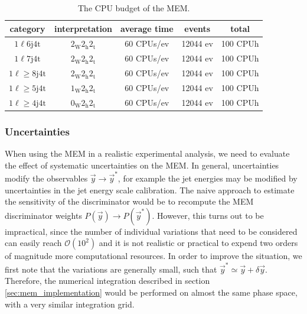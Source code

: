 \begin{table}[h!]
\begin{center}
\caption{The CPU budget of the MEM. \fix}
\label{tab:mem_cpu_budget}
\begin{tabular}{ccccc}
\hline
category & interpretation & average time & events & total \\
\hline
$1\ell6\mathrm{j}4\mathrm{t}$ & $2_{\mathrm{W}} 2_{\mathrm{h}} 2_{\mathrm{t}}$ & 60 CPUs/ev & 12044 ev & 100 CPUh \\
$1\ell7\mathrm{j}4\mathrm{t}$ & $2_{\mathrm{W}} 2_{\mathrm{h}} 2_{\mathrm{t}}$ & 60 CPUs/ev & 12044 ev & 100 CPUh \\
$1\ell\ge8\mathrm{j}4\mathrm{t}$ & $2_{\mathrm{W}} 2_{\mathrm{h}} 2_{\mathrm{t}}$ & 60 CPUs/ev & 12044 ev & 100 CPUh \\
$1\ell\ge5\mathrm{j}4\mathrm{t}$ & $1_{\mathrm{W}} 2_{\mathrm{h}} 2_{\mathrm{t}}$ & 60 CPUs/ev & 12044 ev & 100 CPUh \\
$1\ell\ge4\mathrm{j}4\mathrm{t}$ & $0_{\mathrm{W}} 2_{\mathrm{h}} 2_{\mathrm{t}}$ & 60 CPUs/ev & 12044 ev & 100 CPUh \\

\hline
\hline
\end{tabular}
\end{center}
\end{table}

\subsubsection{Uncertainties}
\label{sec:mem_uncertainties}

When using the MEM in a realistic experimental analysis, we need to evaluate the effect of systematic uncertainties on the MEM. In general, uncertainties modify the observables $\vec{y} \rightarrow \vec{y}^*$, for example the jet energies may be modified by uncertainties in the jet energy scale calibration. The naive approach to estimate the sensitivity of the discriminator would be to recompute the MEM discriminator weights $P(\vec{y}) \rightarrow P(\vec{y}^*)$. However, this turns out to be impractical, since the number of individual variations that need to be considered can easily reach $\mathcal{O}(10^2)$ and it is not realistic or practical to expend two orders of magnitude more computational resources.
In order to improve the situation, we first note that the variations are generally small, such that $\vec{y}^* \simeq \vec{y} + \delta \vec{y}$. Therefore, the numerical integration described in section \cref{sec:mem_implementation} would be performed on almost the same phase space, with a very similar integration grid.

